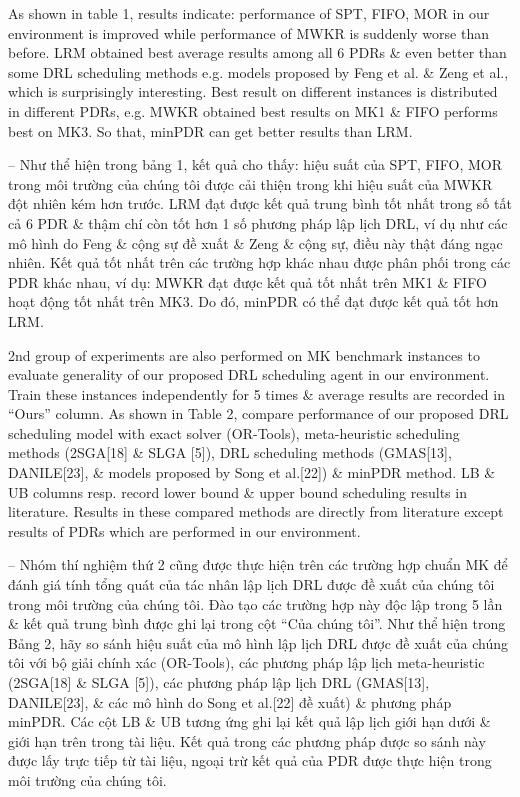 \documentclass{article}
\begin{document}
\begin{itemize}
\begin{itemize}
        As shown in table 1, results indicate: performance of SPT, FIFO, MOR in our environment is improved while performance of MWKR is suddenly worse than before. LRM obtained best average results among all 6 PDRs \& even better than some DRL scheduling methods e.g. models proposed by Feng et al. \& Zeng et al., which is surprisingly interesting. Best result on different instances is distributed in different PDRs, e.g. MWKR obtained best results on MK1 \& FIFO performs best on MK3. So that, minPDR can get better results than LRM.

        -- Như thể hiện trong bảng 1, kết quả cho thấy: hiệu suất của SPT, FIFO, MOR trong môi trường của chúng tôi được cải thiện trong khi hiệu suất của MWKR đột nhiên kém hơn trước. LRM đạt được kết quả trung bình tốt nhất trong số tất cả 6 PDR \& thậm chí còn tốt hơn 1 số phương pháp lập lịch DRL, ví dụ như các mô hình do Feng \& cộng sự đề xuất \& Zeng \& cộng sự, điều này thật đáng ngạc nhiên. Kết quả tốt nhất trên các trường hợp khác nhau được phân phối trong các PDR khác nhau, ví dụ: MWKR đạt được kết quả tốt nhất trên MK1 \& FIFO hoạt động tốt nhất trên MK3. Do đó, minPDR có thể đạt được kết quả tốt hơn LRM.

        2nd group of experiments are also performed on MK benchmark instances to evaluate generality of our proposed DRL scheduling agent in our environment. Train these instances independently for 5 times \& average results are recorded in ``Ours'' column. As shown in Table 2, compare performance of our proposed DRL scheduling model with exact solver (OR-Tools), meta-heuristic scheduling methods (2SGA[18] \& SLGA [5]), DRL scheduling methods (GMAS[13], DANILE[23], \& models proposed by Song et al.[22]) \& minPDR method. LB \& UB columns resp. record lower bound \& upper bound scheduling results in literature. Results in these compared methods are directly from literature except results of PDRs which are performed in our environment.

        -- Nhóm thí nghiệm thứ 2 cũng được thực hiện trên các trường hợp chuẩn MK để đánh giá tính tổng quát của tác nhân lập lịch DRL được đề xuất của chúng tôi trong môi trường của chúng tôi. Đào tạo các trường hợp này độc lập trong 5 lần \& kết quả trung bình được ghi lại trong cột ``Của chúng tôi''. Như thể hiện trong Bảng 2, hãy so sánh hiệu suất của mô hình lập lịch DRL được đề xuất của chúng tôi với bộ giải chính xác (OR-Tools), các phương pháp lập lịch meta-heuristic (2SGA[18] \& SLGA [5]), các phương pháp lập lịch DRL (GMAS[13], DANILE[23], \& các mô hình do Song et al.[22] đề xuất) \& phương pháp minPDR. Các cột LB \& UB tương ứng ghi lại kết quả lập lịch giới hạn dưới \& giới hạn trên trong tài liệu. Kết quả trong các phương pháp được so sánh này được lấy trực tiếp từ tài liệu, ngoại trừ kết quả của PDR được thực hiện trong môi trường của chúng tôi.


\end{itemize}
\end{itemize}
\end{document}
